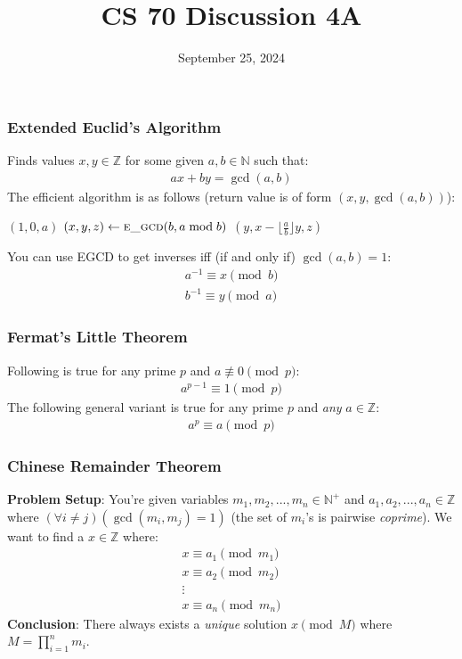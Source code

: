 \documentclass{beamer}
\title{CS 70 Discussion 4A}
\date{September 25, 2024}
\begin{document}
\frame{\titlepage}

\begin{frame}
    \frametitle{Extended Euclid's Algorithm}
    Finds values $x,y\in\mathbb{Z}$ for some given $a,b\in\mathbb{N}$ such that:
    \begin{gather*}
        ax+by=\gcd(a,b)
    \end{gather*}
    The efficient algorithm is as follows (return value is of form $(x,y,\gcd(a,b))$):
    \begin{algorithmic}
                \Return $(1,0,a)$
            \Else
                \State $(x,y,z)\gets \Call{e\_gcd}{b,a\bmod b}$
                \State \Return $(y,x-\lfloor\frac{a}{b}\rfloor y,z)$
            \EndIf
        \EndFunction
    \end{algorithmic}
    You can use EGCD to get inverses iff (if and only if) $\gcd(a,b)=1$:
    \begin{gather*}
        a^{-1}\equiv x\pmod b\\
        b^{-1}\equiv y\pmod a 
    \end{gather*}
\end{frame}

\begin{frame}
    \frametitle{Fermat's Little Theorem}
    Following is true for any prime $p$ and $a\not\equiv 0\pmod p$:
    \begin{gather*}
        a^{p-1}\equiv 1\pmod p
    \end{gather*}
    The following general variant is true for any prime $p$ and {\it any} $a\in\mathbb{Z}$:
    \begin{gather*}
        a^p\equiv a\pmod p
    \end{gather*}
\end{frame}

\begin{frame}
    \frametitle{Chinese Remainder Theorem}
    {\bf Problem Setup}: You're given variables $m_1,m_2,...,m_n\in\mathbb{N}^+$ and $a_1,a_2,...,a_n\in\mathbb{Z}$ where $(\forall i\neq j)(\gcd(m_i,m_j)=1)$ (the set of $m_i$'s is pairwise {\it coprime}). We want to find a $x\in\mathbb{Z}$ where:
    \begin{gather*}
        x\equiv a_1\pmod {m_1}\\
        x\equiv a_2\pmod {m_2}\\
        \vdots\\
        x\equiv a_n\pmod {m_n}
    \end{gather*}
    {\bf Conclusion}: There always exists a {\it unique} solution $x\pmod M$ where $M=\prod_{i=1}^n m_i$.
\end{frame}
\end{document}
